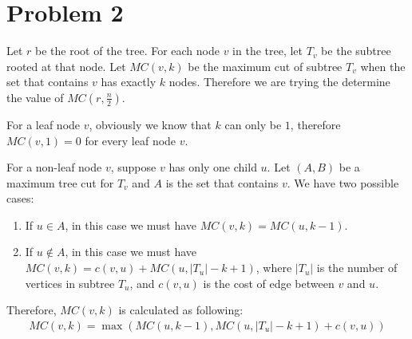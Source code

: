 \documentclass{article}
\begin{document}
\section*{Problem 2}
Let $r$ be the root of the tree. For each node $v$ in the tree, let $T_v$ be the subtree rooted at 
that node. Let $MC(v, k)$ be the maximum cut of subtree $T_v$ when the set that contains $v$ has
exactly $k$ nodes. Therefore we are trying the determine the value of $MC(r, \frac{n}{2})$.

For a leaf node $v$, obviously we know that $k$ can only be $1$, therefore $MC(v, 1) = 0$ for every
leaf node $v$.

For a non-leaf node $v$, suppose $v$ has only one child $u$. Let $(A, B)$ be a maximum tree cut for
$T_v$ and $A$ is the set that contains $v$. We have two possible cases:
\begin{enumerate}
  \item If $u \in A$, in this case we must have $MC(v, k) = MC(u, k-1)$.
  \item If $u \notin A$, in this case we must have $MC(v, k) = c(v, u) + MC(u, |T_u| - k + 1)$, where $|T_u|$
    is the number of vertices in subtree $T_u$, and $c(v, u)$ is the cost of edge between $v$ and
    $u$. 
\end{enumerate}
Therefore, $MC(v, k)$ is calculated as following:
\begin{align}
MC(v, k) = \max(MC(u, k-1), MC(u, |T_u| - k + 1) + c(v, u))
\end{align}



\end{document}
